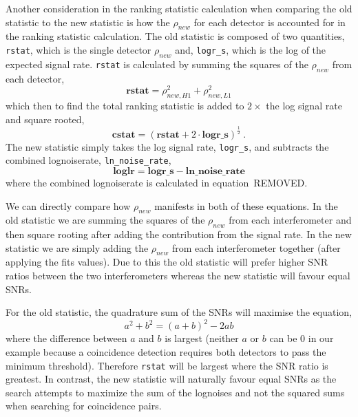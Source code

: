 Another consideration in the ranking statistic calculation when comparing the old statistic to the new statistic is how the $\rho_{new}$ for each detector is accounted for in the ranking statistic calculation. The old statistic is composed of two quantities, \verb|rstat|, which is the single detector $\rho_{new}$ and, \verb|logr_s|, which is the log of the expected signal rate. \verb|rstat| is calculated by summing the squares of the $\rho_{new}$ from each detector,
%
\begin{equation}
    \textbf{rstat} = \rho_{new, H1}^{2} + \rho_{new, L1}^{2}
\end{equation}
%
which then to find the total ranking statistic is added to $2 \times$ the log signal rate and square rooted,
%
\begin{equation}
    \textbf{cstat} = (\textbf{rstat} + 2 \cdot \textbf{logr\_s})^{\frac{1}{2}} \ .
\end{equation}
%
The new statistic simply takes the log signal rate, \verb|logr_s|, and subtracts the combined lognoiserate, \verb|ln_noise_rate|,
%
\begin{equation}
    \textbf{loglr} = \textbf{logr\_s} - \textbf{ln\_noise\_rate}
\end{equation}
%
where the combined lognoiserate is calculated in equation~REMOVED.

We can directly compare how $\rho_{new}$ manifests in both of these equations. In the old statistic we are summing the squares of the $\rho_{new}$ from each interferometer and then square rooting after adding the contribution from the signal rate. In the new statistic we are simply adding the $\rho_{new}$ from each interferometer together (after applying the fits values). Due to this the old statistic will prefer higher SNR ratios between the two interferometers whereas the new statistic will favour equal SNRs.

For the old statistic, the quadrature sum of the SNRs will maximise the equation,
%
\begin{equation}
    a^{2} + b^{2} = (a + b)^{2} - 2ab
\end{equation}
%
where the difference between $a$ and $b$ is largest (neither $a$ or $b$ can be $0$ in our example because a coincidence detection requires both detectors to pass the minimum threshold). Therefore \verb|rstat| will be largest where the SNR ratio is greatest. In contrast, the new statistic will naturally favour equal SNRs as the search attempts to maximize the sum of the lognoises and not the squared sums when searching for coincidence pairs.

